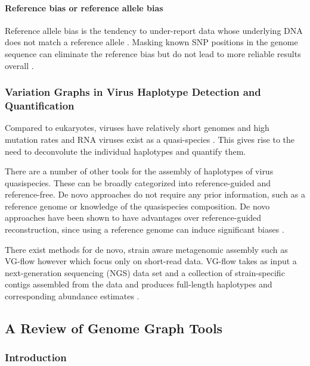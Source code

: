 \documentclass[10pt, a4paper]{article}
\begin{document}
\paragraph{Reference bias or reference allele bias}
\label{sec:org59d3fc4}
Reference allele bias is the tendency to under-report data whose underlying DNA
does not match a reference allele \cite{patenGenomeGraphsEvolution2017}.
Masking known SNP positions in the genome sequence can eliminate the reference
bias but do not lead to more reliable results overall
\cite{degnerEffectReadmappingBiases2009}.

\subsubsection{Variation Graphs in Virus Haplotype Detection and Quantification}
\label{sec:org600d2bc}
Compared to eukaryotes, viruses have relatively short genomes and high mutation 
rates \cite{duffyWhyAreRNA2018} and RNA viruses exist as a quasi-species 
\cite{domingoViralQuasispeciesEvolution2012}. This gives rise to the need to
deconvolute the individual haplotypes and quantify them.

There are a number of other tools for the assembly of haplotypes of virus
quasispecies.
These can be broadly categorized into reference-guided and reference-free.
De novo approaches do not require any prior information, such as a reference
genome or knowledge of the quasispecies composition. De novo approaches have
been shown to have advantages over reference-guided reconstruction, since using
a reference genome can induce significant biases
\cite{baaijensStrainawareAssemblyGenomes2020}.

There exist methods for de novo, strain aware metagenomic assembly such as 
VG-flow \cite{baaijensStrainawareAssemblyGenomes2020} however which focus only on 
short-read data.
VG-flow takes as input a next-generation sequencing (NGS) data set and a 
collection of strain-specific contigs assembled from the data and produces 
full-length haplotypes and corresponding abundance estimates 
\cite{baaijensStrainawareAssemblyGenomes2020}.
\subsection{A Review of Genome Graph Tools}
\label{sec:orgfd8d396}
\subsubsection{Introduction}
\label{sec:org08b3973}
\end{document}
